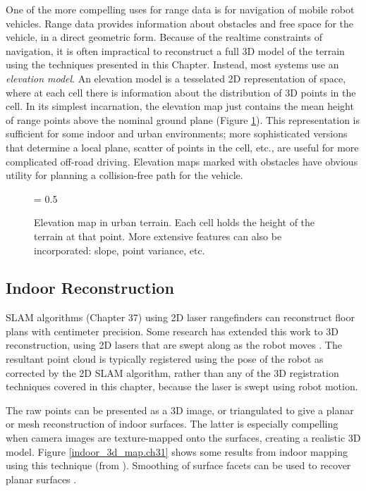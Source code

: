\documentclass[twocolumn,oneside]{book}
\begin{document}
One of the more compelling uses for range data is for navigation of
mobile robot vehicles.  Range data provides information about
obstacles and free space for the vehicle, in a direct geometric form.
Because of the realtime constraints of navigation, it is often
impractical to reconstruct a full 3D model of the terrain using the
techniques presented in this Chapter.  Instead, most systems use an
{\em elevation model}.  An elevation model is a tesselated 2D
representation of space, where at each cell there is information about
the distribution of 3D points in the cell.  In its simplest
incarnation, the elevation map just contains the mean height of range
points above the nominal ground plane (Figure
\ref{elevation_map.ch31}).  This representation is sufficient for some
indoor and urban environments; more sophisticated versions that
determine a local plane, scatter of points in the cell, etc., are
useful for more complicated off-road driving.  Elevation maps marked
with obstacles have obvious utility for planning a collision-free path
for the vehicle.

\begin{figure}[hbt]
{\epsfxsize = 0.5\textwidth {}}
\caption{Elevation map in urban terrain.  Each cell holds the height
of the terrain at that point.  More extensive features can also be
incorporated: slope, point variance, etc.
\label{elevation_map.ch31}}
\end{figure}


\subsection{Indoor Reconstruction}

SLAM algorithms (Chapter 37) using 2D laser rangefinders can
reconstruct floor plans with centimeter precision.  Some research has
extended this work to 3D reconstruction, using 2D lasers that are
swept along as the robot moves \cite{thrun00}.  The resultant point
cloud is typically registered using the pose of the robot as corrected
by the 2D SLAM algorithm, rather than any of the 3D registration
techniques covered in this chapter, because the laser is swept using
robot motion.

The raw points can be presented as a 3D image, or triangulated to give
a planar or mesh reconstruction of indoor surfaces. 
The latter is
especially compelling when camera images are texture-mapped onto the
surfaces, creating a realistic 3D model.  Figure
\ref{indoor_3d_map.ch31} shows some results from indoor mapping using
this technique (from \cite{thrun00}).  Smoothing of surface facets can
be used to recover planar surfaces \cite{liu01}.
\end{document}
